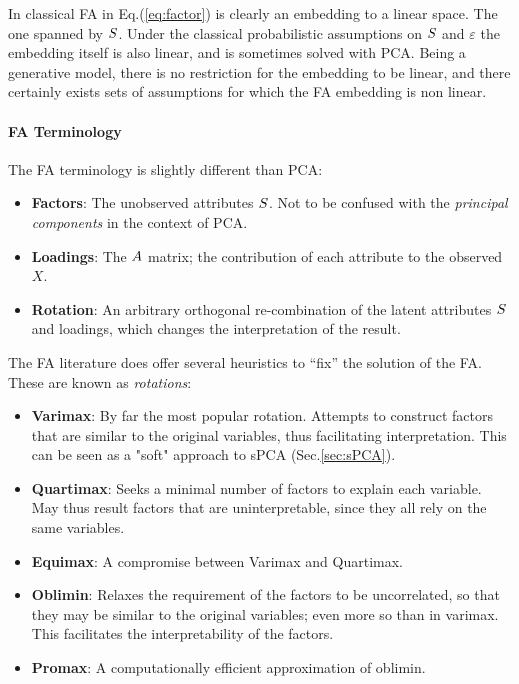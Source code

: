 \documentclass[12pt,a4paper]{article}
\begin{document}
\begin{remark}
	In classical FA in Eq.(\ref{eq:factor}) is clearly an embedding to a linear space. 
	The one spanned by $S$. 
	Under the classical probabilistic assumptions on $S$ and $\varepsilon$ the embedding itself is also linear, and is sometimes solved with PCA. 
	Being a generative model, there is no restriction for the embedding to be linear, and there certainly exists sets of assumptions for which the FA embedding is non linear. 
\end{remark}

\paragraph{FA Terminology}
The FA terminology is slightly different than PCA:
\begin{itemize}
	\item \textbf{Factors}: The unobserved attributes $S$. 
	Not to be confused with the \emph{principal components} in the context of PCA.
	\item \textbf{Loadings}: 
	The $A$ matrix; the contribution of each attribute to the observed $X$.
	\item \textbf{Rotation}: An arbitrary orthogonal re-combination of the latent attributes $S$ and loadings, which changes the interpretation of the result.
\end{itemize}


The FA literature does offer several heuristics to ``fix'' the solution of the FA. 
These are known as \emph{rotations}:
\begin{itemize}
	\item \textbf{Varimax}: 
	By far the most popular rotation. Attempts to construct factors that are similar to the original variables, thus facilitating interpretation. 
	This can be seen as a "soft" approach to sPCA (Sec.\ref{sec:sPCA}).
	
	\item \textbf{Quartimax}: 
	Seeks a minimal number of factors to explain each variable. 
	May thus result factors that are uninterpretable, since they all rely on the same variables.
	
	\item \textbf{Equimax}: A compromise between Varimax and Quartimax. 
	
	\item \textbf{Oblimin}: 
	Relaxes the requirement of the factors to be uncorrelated, so that they may be similar to the original variables; even more so than in varimax. 
	This facilitates the interpretability of the factors. 
	
	\item \textbf{Promax}: 
	A computationally efficient approximation of oblimin.
\end{itemize}
\end{document}
